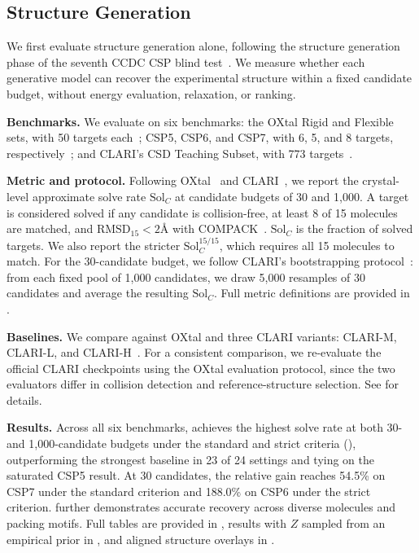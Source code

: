 \subsection{Structure Generation}
\label{sec:structure-generation}

We first evaluate structure generation alone, following the structure generation phase of the seventh CCDC CSP blind test~\citep{hunnisett2024seventhgeneration}. We measure whether each generative model can recover the experimental structure within a fixed candidate budget, without energy evaluation, relaxation, or ranking.

\textbf{Benchmarks.} We evaluate on six benchmarks: the OXtal Rigid and Flexible sets, with 50 targets each~\citep{jin2025oxtal}; CSP5, CSP6, and CSP7, with 6, 5, and 8 targets, respectively~\citep{bardwell2011fifth,reilly2016sixth,hunnisett2024seventhgeneration}; and CLARI's CSD Teaching Subset, with 773 targets~\citep{battle2010applications,lo2026clari}.

\textbf{Metric and protocol.} Following OXtal~\citep{jin2025oxtal} and CLARI~\citep{lo2026clari}, we report the crystal-level approximate solve rate $\mathrm{Sol}_C$ at candidate budgets of 30 and 1{,}000. A target is considered solved if any candidate is collision-free, at least 8 of 15 molecules are matched, and $\mathrm{RMSD}_{15}<2\text{\AA}$ with COMPACK~\citep{chisholm2005compack}. $\mathrm{Sol}_C$ is the fraction of solved targets. We also report the stricter $\mathrm{Sol}_C^{15/15}$, which requires all 15 molecules to match. For the 30-candidate budget, we follow CLARI's bootstrapping protocol~\citep{lo2026clari}: from each fixed pool of 1{,}000 candidates, we draw 5{,}000 resamples of 30 candidates and average the resulting $\mathrm{Sol}_C$. Full metric definitions are provided in .

\textbf{Baselines.} We compare against OXtal and three CLARI variants: CLARI-M, CLARI-L, and CLARI-H~\citep{jin2025oxtal,lo2026clari}. For a consistent comparison, we re-evaluate the official CLARI checkpoints using the OXtal evaluation protocol, since the two evaluators differ in collision detection and reference-structure selection. See  for details.

\textbf{Results.} Across all six benchmarks, \model{} achieves the highest solve rate at both 30- and 1{,}000-candidate budgets under the standard
and strict criteria (),
outperforming the strongest baseline in 23 of 24 settings and tying on the saturated CSP5 result. At 30 candidates, the relative gain
reaches 54.5\% on CSP7 under the standard criterion and 188.0\% on CSP6 under the strict criterion.
 further demonstrates accurate recovery across diverse molecules and packing motifs.
Full tables are provided in , results with $Z$ sampled from an empirical prior in
, and aligned structure overlays in .







